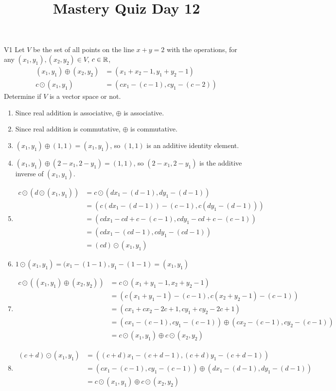\documentclass{sbgLAquiz}
\title{Mastery Quiz Day 12 }
\begin{document}
\begin{problem}{V1}
Let $V$ be the set of all points on the line $x+y=2$ with the operations, for any $(x_1,y_1), (x_2,y_2) \in V$, $c \in \mathbb{R}$,
\begin{align*}
(x_1,y_1) \oplus (x_2,y_2) &= (x_1+x_2-1,y_1+y_2-1) \\
c \odot (x_1,y_1) &= (cx_1-(c-1), cy_1-(c-2))
\end{align*}
Determine if $V$ is a vector space or not.
\end{problem}
\begin{solution}
\begin{enumerate}[1)]
\item Since real addition is associative, $\oplus$ is associative.
\item Since real addition is commutative, $\oplus$ is commutative.
\item $(x_1,y_1) \oplus (1,1) = (x_1,y_1)$, so $(1,1)$ is an additive identity element.
\item $(x_1,y_1) \oplus (2-x_1,2-y_1) = (1,1)$, so $(2-x_1,2-y_1)$ is the additive inverse of $(x_1,y_1)$.
\item \begin{align*} c\odot \left(d \odot (x_1,y_1) \right) &=c\odot \left( dx_1-(d-1),dy_1-(d-1)\right) \\ 
&= \left( c\left(dx_1-(d-1) \right)-(c-1), c\left(dy_1-(d-1) \right) \right) \\
&= \left(cdx_1-cd+c-(c-1), cdy_1-cd+c-(c-1) \right) \\
&= \left(cdx_1-(cd-1), cdy_1-(cd-1) \right) \\
&= (cd) \odot (x_1,y_1)
\end{align*}
\item $1 \odot (x_1,y_1) = (x_1-(1-1),y_1-(1-1)=(x_1,y_1)$
\item \begin{align*} c \odot \left( (x_1,y_1)\oplus(x_2,y_2) \right) &= 
c\odot \left( x_1+y_1-1,x_2+y_2-1 \right) \\
&= \left( c(x_1+y_1-1)-(c-1), c(x_2+y_2-1)-(c-1) \right) \\
&= (cx_1+cx_2-2c+1, cy_1+cy_2-2c+1) \\
&= \left(cx_1-(c-1),cy_1-(c-1) \right) \oplus (cx_2-(c-1),cy_2-(c-1)) \\
&=c \odot (x_1,y_1) \oplus c\odot (x_2,y_2) 
\end{align*}
\item \begin{align*} (c+d) \odot (x_1,y_1) &=
\left( (c+d)x_1-(c+d-1), (c+d)y_1-(c+d-1) \right) \\
&= \left( cx_1-(c-1), cy_1-(c-1) \right) \oplus (dx_1-(d-1), dy_1-(d-1) ) \\
&= c\odot (x_1,y_1) \oplus c \odot (x_2,y_2)
\end{align*}
\end{enumerate}
\end{solution}
\end{document}
